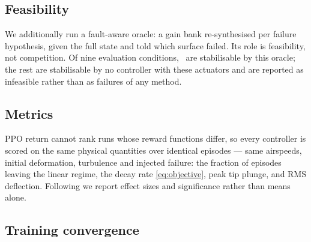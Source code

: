 \documentclass[preprint,11pt,authoryear]{elsarticle}
\begin{document}
\subsection{Feasibility}

We additionally run a fault-aware oracle: a gain bank re-synthesised per failure
hypothesis, given the full state and told which surface failed. Its role is
feasibility, not competition. Of nine evaluation conditions, \FeasibleCells\ are
stabilisable by this oracle; the rest are stabilisable by no controller with
these actuators and are reported as infeasible rather than as failures of any
method.

\subsection{Metrics}

PPO return cannot rank runs whose reward functions differ, so every controller is
scored on the same physical quantities over identical episodes --- same
airspeeds, initial deformation, turbulence and injected failure: the fraction of
episodes leaving the linear regime, the decay rate \eqref{eq:objective}, peak tip
plunge, and RMS deflection. Following \citep{agarwal2021precipice} we report
effect sizes and significance rather than means alone.

\subsection{Training convergence}
\label{sec:convergence}
\end{document}
